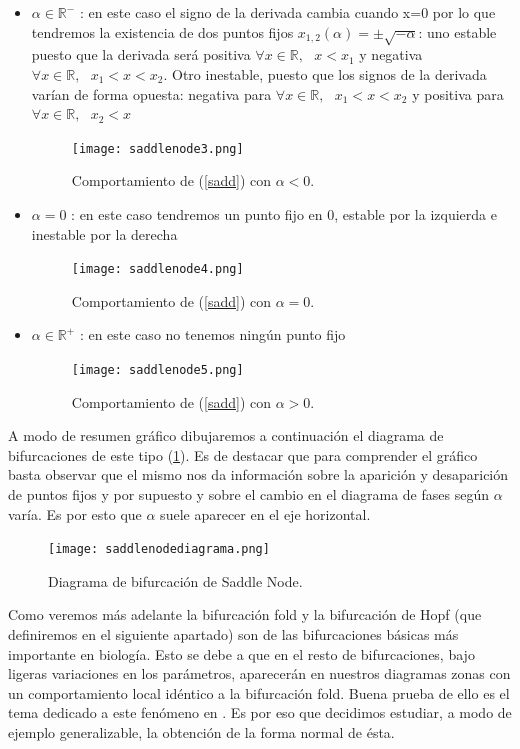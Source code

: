 \begin{enumerate}
 	\begin{itemize}
 		\item $\alpha \in \mathbb{R^-} $ : en este caso el signo de la derivada cambia cuando x=0 por lo que tendremos la existencia de dos puntos fijos $x_{1,2}(\alpha)=\pm \sqrt{-\alpha}$: uno estable puesto que la derivada será positiva $\forall x \in \mathbb{R},\text{ } x < x_1$ y negativa $\forall x \in \mathbb{R},\text{ } x_1< x < x_2$. Otro inestable, puesto que los signos de la derivada varían de forma opuesta: negativa para $\forall x \in \mathbb{R},\text{ } x_1 <x < x_2$ y positiva para $\forall x \in \mathbb{R},\text{ } x_2 < x$
 	\begin{figure}[h]
 		\centering
 		\texttt{[image: saddlenode3.png]}
 		\caption{Comportamiento de (\ref{sadd}) con $\alpha<0$.}
 	\end{figure}
 		\item $\alpha=0$
 		: en este caso tendremos un punto fijo en 0, estable por la izquierda e inestable por la derecha
 		\begin{figure}[h]
 			\centering
 			\texttt{[image: saddlenode4.png]}
 			\caption{Comportamiento de (\ref{sadd}) con $\alpha=0$.}
 		\end{figure}
 		\item $\alpha \in \mathbb{R^+} $ : en este caso no tenemos ningún punto fijo
 		\begin{figure}[h]
 			\centering
 			\texttt{[image: saddlenode5.png]}
 			\caption{Comportamiento de (\ref{sadd}) con $\alpha>0$.}
 		\end{figure}
 	\end{itemize}
 	A modo de resumen gráfico dibujaremos a continuación el diagrama de bifurcaciones de este tipo (\ref{diagfold}). Es de destacar que para comprender el gráfico basta observar que el mismo nos da información sobre la aparición y desaparición de puntos fijos y por supuesto y sobre el cambio en el diagrama de fases según $\alpha$ varía. Es por esto que $\alpha$ suele aparecer en el eje horizontal.
 	\begin{figure}[h]
 		\centering
 		\texttt{[image: saddlenodediagrama.png]}
 		\caption{Diagrama de bifurcación de Saddle Node.}
 		\label{diagfold}
 	\end{figure}
 	Como veremos más adelante la bifurcación fold y la bifurcación de Hopf (que definiremos en el siguiente apartado) son de las bifurcaciones básicas más importante en biología. Esto se debe a que en el resto de bifurcaciones, bajo ligeras variaciones en los parámetros, aparecerán en nuestros diagramas zonas con un comportamiento local idéntico a la bifurcación fold. Buena prueba de ello es el tema dedicado a este fenómeno en \cite{Strogatz}. Es por eso que decidimos estudiar, a modo de ejemplo generalizable, la obtención de la forma normal de ésta.
 	

\end{enumerate}
